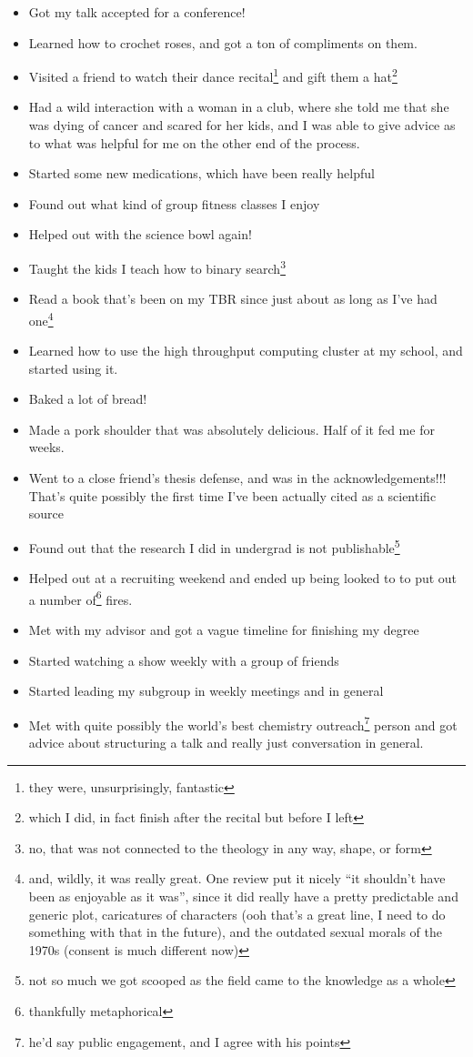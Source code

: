 \documentclass[12pt]{article}[titlepage]
\newcommand{\say}[1]{``#1''}
\renewcommand{\,}{\textsuperscript{,}}
\begin{document}
\begin{itemize}  
\item Got my talk accepted for a conference!  
\item Learned how to crochet roses, and got a ton of compliments on them.  
\item Visited a friend to watch their dance recital\footnote{they were, unsurprisingly, fantastic} and gift them a hat\footnote{which I did, in fact finish after the recital but before I left}  
\item Had a wild interaction with a woman in a club, where she told me that she was dying of cancer and scared for her kids, and I was able to give advice as to what was helpful for me on the other end of the process.  
\item Started some new medications, which have been really helpful  
\item Found out what kind of group fitness classes I enjoy  
\item Helped out with the science bowl again!  
\item Taught the kids I teach how to binary search\footnote{no, that was not connected to the theology in any way, shape, or form}  
\item Read a book that's been on my TBR since just about as long as I've had one\footnote{and, wildly, it was really great. One review put it nicely \say{it shouldn't have been as enjoyable as it was}, since it did really have a pretty predictable and generic plot, caricatures of characters (ooh that's a great line, I need to do something with that in the future), and the outdated sexual morals of the 1970s (consent is much different now)}  
\item Learned how to use the high throughput computing cluster at my school, and started using it.  
\item Baked a lot of bread!  
\item Made a pork shoulder that was absolutely delicious. Half of it fed me for weeks.  
\item Went to a close friend's thesis defense, and was in the acknowledgements!!! That's quite possibly the first time I've been actually cited as a scientific source  
\item Found out that the research I did in undergrad is not publishable\footnote{not so much we got scooped as the field came to the knowledge as a whole}  
\item Helped out at a recruiting weekend and ended up being looked to to put out a number of\footnote{thankfully metaphorical} fires.  
\item Met with my advisor and got a vague timeline for finishing my degree  
\item Started watching a show weekly with a group of friends  
\item Started leading my subgroup in weekly meetings and in general  
\item Met with quite possibly the world's best chemistry outreach\footnote{he'd say public engagement, and I agree with his points} person and got advice about structuring a talk and really just conversation in general.  
\end{itemize}
\end{document}
